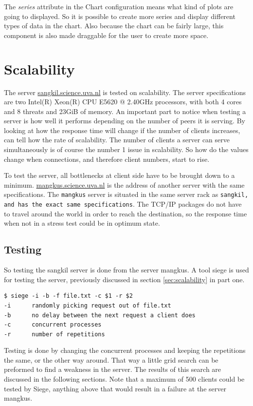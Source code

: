 The \emph{series} attribute in the Chart configuration means what kind of plots are going to displayed. So it is possible to create more series and display different types of data in the chart. Also because the chart can be fairly large, this component is also made draggable for the user to create more space.

\section{Scalability}
The server \url{sangkil.science.uva.nl} is tested on scalability. The server specifications are two Intel(R) Xeon(R) CPU E5620  @ 2.40GHz processors, with both 4 cores and 8 threats and 23GiB of memory. An important part to notice when testing a server is how well it performs depending on the number of peers it is serving. By looking at how the response time will change if the number of clients increases, can tell how the rate of scalability. The number of clients a server can serve simultaneously is of course the number 1 issue in scalability. So how do the values change when connections, and therefore client numbers, start to rise.

To test the server, all bottlenecks at client side have to be brought down to a minimum. \url{mangkus.science.uva.nl} is the address of another server with the same specifications. The \texttt{mangkus} server is situated in the same server rack as \texttt{sangkil, and has the exact same specifications}. The TCP/IP packages do not have to travel around the world in order to reach the destination, so the response time when not in a stress test could be in optimum state. 

\subsection{Testing}
So testing the sangkil server is done from the server mangkus. A tool siege is used for testing the server, previously discussed in section \ref{sec:scalability} in part one.
\begin{lstlisting}
$ siege -i -b -f file.txt -c $1 -r $2
-i		randomly picking request out of file.txt
-b		no delay between the next request a client does
-c		concurrent processes
-r		number of repetitions
\end{lstlisting}

Testing is done by changing the concurrent processes and keeping the repetitions the same, or the other way around. That way a little grid search can be preformed to find a weakness in the server. The results of this search are discussed in the following sections. Note that a maximum of 500 clients could be tested by Siege, anything above that would result in a failure at the server mangkus. 

